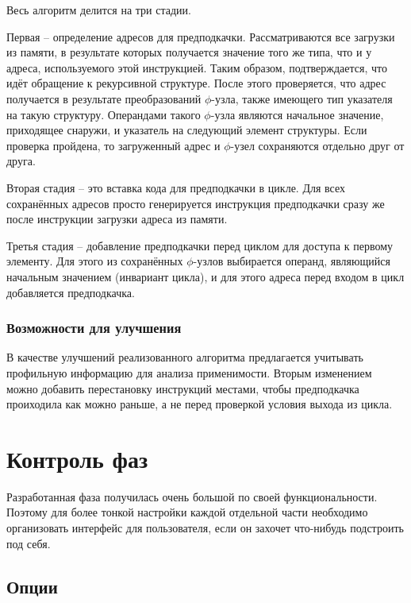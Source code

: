 \documentclass[12pt,a4paper,oneside]{article}
\begin{document}
\indent

Весь алгоритм делится на три стадии.

Первая -- определение адресов для предподкачки. Рассматриваются все загрузки из памяти, в результате которых получается значение того же типа, что и у адреса, используемого этой инструкцией. Таким образом, подтверждается, что идёт обращение к рекурсивной структуре. После этого проверяется, что адрес получается в результате преобразований $\phi$-узла, также имеющего тип указателя на такую структуру. Операндами такого $\phi$-узла являются начальное значение, приходящее снаружи, и указатель на следующий элемент структуры. Если проверка пройдена, то загруженный адрес и $\phi$-узел сохраняются отдельно друг от друга.

Вторая стадия -- это вставка кода для предподкачки в цикле. Для всех сохранённых адресов просто генерируется инструкция предподкачки сразу же после инструкции загрузки адреса из памяти.

Третья стадия -- добавление предподкачки перед циклом для доступа к первому элементу. Для этого из сохранённых $\phi$-узлов выбирается операнд, являющийся начальным значением (инвариант цикла), и для этого адреса перед входом в цикл добавляется предподкачка.

\subsubsection{Возможности для улучшения}

\indent

В качестве улучшений реализованного алгоритма предлагается учитывать профильную информацию для анализа применимости. Вторым изменением можно добавить перестановку инструкций местами, чтобы предподкачка проиходила как можно раньше, а не перед проверкой условия выхода из цикла.

\section{Контроль фаз}

\indent

Разработанная фаза получилась очень большой по своей функциональности. Поэтому для более тонкой настройки каждой отдельной части необходимо организовать интерфейс для пользователя, если он захочет что-нибудь подстроить под себя.

\subsection{Опции}
\end{document}
